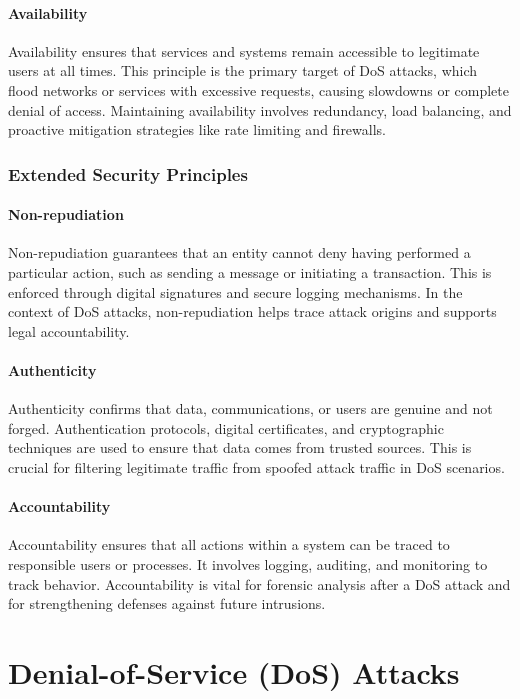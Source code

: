 \documentclass[12pt]{report}
\begin{document}
\paragraph{Availability} 
Availability ensures that services and systems remain accessible to legitimate users at all times. This principle is the primary target of DoS attacks, which flood networks or services with excessive requests, causing slowdowns or complete denial of access. Maintaining availability involves redundancy, load balancing, and proactive mitigation strategies like rate limiting and firewalls.

\subsubsection{Extended Security Principles}
\paragraph{Non-repudiation} 
Non-repudiation guarantees that an entity cannot deny having performed a particular action, such as sending a message or initiating a transaction. This is enforced through digital signatures and secure logging mechanisms. In the context of DoS attacks, non-repudiation helps trace attack origins and supports legal accountability.

\paragraph{Authenticity} 
Authenticity confirms that data, communications, or users are genuine and not forged. Authentication protocols, digital certificates, and cryptographic techniques are used to ensure that data comes from trusted sources. This is crucial for filtering legitimate traffic from spoofed attack traffic in DoS scenarios.

\paragraph{Accountability} 
Accountability ensures that all actions within a system can be traced to responsible users or processes. It involves logging, auditing, and monitoring to track behavior. Accountability is vital for forensic analysis after a DoS attack and for strengthening defenses against future intrusions.

\section{Denial-of-Service (DoS) Attacks}
\end{document}
